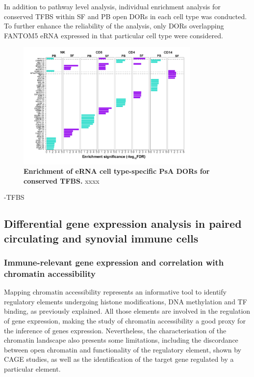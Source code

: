 In addition to pathway level analysis, individual enrichment analysis for conserved TFBS within SF and PB open DORs in each cell type was conducted. To further enhance the reliability of the analysis, only DORs overlapping FANTOM5 eRNA expressed in that particular cell type were considered. 


\begin{figure}[htbp]
\centering
\includegraphics[width=0.8\textwidth]{./Results3/pdfs/ATAC_PSA_enrichment_conserved_TFBS_barplots_cell_type_specific_DOCS_all_cell_types_per_tissue}
\caption[Enrichment of eRNA cell type-specific PsA DORs for conserved TFBS.]{\textbf{Enrichment of eRNA cell type-specific PsA DORs for conserved TFBS.} xxxx }
\label{fig:PSA_TFBS}
\end{figure}


-TFBS



\subsection{Differential gene expression analysis in paired circulating and synovial immune cells}

\subsubsection{Immune-relevant gene expression and correlation with chromatin accessibility}
Mapping chromatin accessibility represents an informative tool to identify regulatory elements undergoing histone modifications, DNA methylation and TF binding, as previously explained. All those elements are involved in the regulation of gene expression, making the study of chromatin accessibility a good proxy for the inference of genes expression. Nevertheless, the characterisation of the chromatin landscape also presents some limitations, including the discordance between open chromatin and functionality of the regulatory element, shown by CAGE studies, as well as the identification of the target gene regulated by a particular element. 

